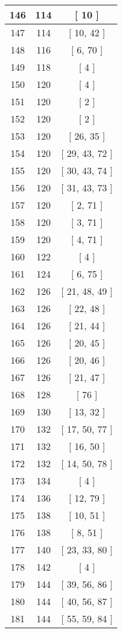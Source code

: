 \begin{center}
\begin{longtable}[H]{|| c c c ||}
\hline
146 & 114 & [ 10 ] \\ 
\hline
147 & 114 & [ 10, 42 ] \\ 
\hline
148 & 116 & [ 6, 70 ] \\ 
\hline
149 & 118 & [ 4 ] \\ 
\hline
150 & 120 & [ 4 ] \\ 
\hline
151 & 120 & [ 2 ] \\ 
\hline
152 & 120 & [ 2 ] \\ 
\hline
153 & 120 & [ 26, 35 ] \\ 
\hline
154 & 120 & [ 29, 43, 72 ] \\ 
\hline
155 & 120 & [ 30, 43, 74 ] \\ 
\hline
156 & 120 & [ 31, 43, 73 ] \\ 
\hline
157 & 120 & [ 2, 71 ] \\ 
\hline
158 & 120 & [ 3, 71 ] \\ 
\hline
159 & 120 & [ 4, 71 ] \\ 
\hline
160 & 122 & [ 4 ] \\ 
\hline
161 & 124 & [ 6, 75 ] \\ 
\hline
162 & 126 & [ 21, 48, 49 ] \\ 
\hline
163 & 126 & [ 22, 48 ] \\ 
\hline
164 & 126 & [ 21, 44 ] \\ 
\hline
165 & 126 & [ 20, 45 ] \\ 
\hline
166 & 126 & [ 20, 46 ] \\ 
\hline
167 & 126 & [ 21, 47 ] \\ 
\hline
168 & 128 & [ 76 ] \\ 
\hline
169 & 130 & [ 13, 32 ] \\ 
\hline
170 & 132 & [ 17, 50, 77 ] \\ 
\hline
171 & 132 & [ 16, 50 ] \\ 
\hline
172 & 132 & [ 14, 50, 78 ] \\ 
\hline
173 & 134 & [ 4 ] \\ 
\hline
174 & 136 & [ 12, 79 ] \\ 
\hline
175 & 138 & [ 10, 51 ] \\ 
\hline
176 & 138 & [ 8, 51 ] \\ 
\hline
177 & 140 & [ 23, 33, 80 ] \\ 
\hline
178 & 142 & [ 4 ] \\ 
\hline
179 & 144 & [ 39, 56, 86 ] \\ 
\hline
180 & 144 & [ 40, 56, 87 ] \\ 
\hline
181 & 144 & [ 55, 59, 84 ] \\ 

\end{longtable}
\end{center}
